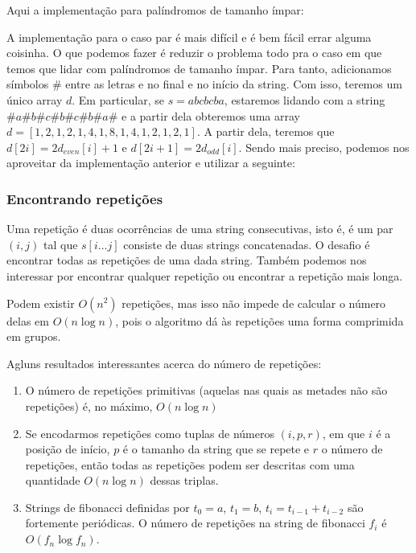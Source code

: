 Aqui a implementação para palíndromos de tamanho ímpar:


A implementação para o caso par é mais difícil e é bem fácil errar alguma coisinha. O que podemos fazer é reduzir o problema todo pra o caso em que temos que lidar com palíndromos de tamanho ímpar. Para tanto, adicionamos símbolos $\#$ entre as letras e no final e no início da string. Com isso, teremos um único array $d$. Em particular, se $s = abcbcba$, estaremos lidando com a string $\# a \# b \# c \# b \# c \# b \# a \#$ e a partir dela obteremos uma array $d = [1,2,1,2,1,4,1,8,1,4,1,2,1,2,1]$. A partir dela, teremos que $d[2i] = 2 d_{even}[i] + 1$ e $d[2i+1] = 2d_{odd}[i]$. Sendo mais preciso, podemos nos aproveitar da implementação anterior e utilizar a seguinte:


\subsubsection{Encontrando repetições}

Uma repetição é duas ocorrências de uma string consecutivas, isto é, é um par $(i, j)$ tal que $s[i \dots j]$ consiste de duas strings concatenadas. O desafio é encontrar todas as repetições de uma dada string. Também podemos nos interessar por encontrar qualquer repetição ou encontrar a repetição mais longa.

Podem existir $O(n^2)$ repetições, mas isso não impede de calcular o número delas em $O(n \log n)$, pois o algoritmo dá às repetições uma forma comprimida em grupos.

Agluns resultados interessantes acerca do número de repetições:

\begin{enumerate}
    \item O número de repetições primitivas (aquelas nas quais as metades não são repetições) é, no máximo, $O(n \log n)$
    \item Se encodarmos repetições como tuplas de números $(i, p, r)$, em que $i$ é a posição de início, $p$ é o tamanho da string que se repete e $r$ o número de repetições, então todas as repetições podem ser descritas com uma quantidade $O(n \log n)$ dessas triplas.
    \item Strings de fibonacci definidas por $t_0=a$, $t_1=b$, $t_i = t_{i-1} + t_{i-2}$ são fortemente periódicas. O número de repetições na string de fibonacci $f_i$ é $O(f_n \log f_n)$.
 \end{enumerate}

